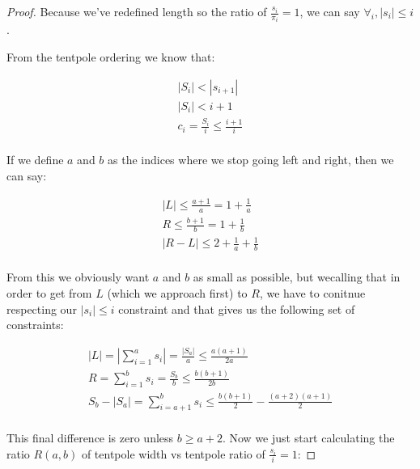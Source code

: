 \begin{proof}
Because we've redefined length so the ratio of $\frac{s_i}{\pi_i} = 1$, we can say $\forall_i, |s_i | \leq i$.

From the tentpole ordering we know that:

\begin{align*}
|S_i| < |s_{i+1}| \\
|S_i| < i+1 \\
c_i = \frac{S_i}{i} \leq \frac{i+1}{i} \\
\end{align*}

If we define $a$ and $b$ as the indices where we stop going left and right, then we can say:

\begin{align*}
|L| \leq \frac{a+1}{a} = 1 + \frac{1}{a}\\
R \leq \frac{b+1}{b} = 1 + \frac{1}{b}\\
|R-L| \leq 2 + \frac{1}{a} + \frac{1}{b} \\
\end{align*}

From this we obviously want $a$ and $b$ as small as possible, but wecalling that in order to get from $L$ (which we approach first) to $R$, we have to conitnue respecting our $|s_i| \leq i$ constraint and that gives us the following set of constraints:

\begin{align*}
|L| = |\sum_{i=1}^a s_i| = \frac{|S_a|}{a} \leq \frac{a(a+1)}{2a} \\
R = \sum_{i=1}^b s_i = \frac{S_b}{b} \leq \frac{b(b+1)}{2b} \\
S_b - |S_a| =  \sum_{i = a+1}^b s_i \leq \frac{b(b+1)}{2} - \frac{(a+2)(a+1)}{2} \\
\end{align*}

This final difference is zero unless $b \geq a+2$. Now we just start calculating the ratio $R(a,b)$ of tentpole width vs tentpole ratio of $\frac{s_i}{i} = 1$:



\end{proof}
